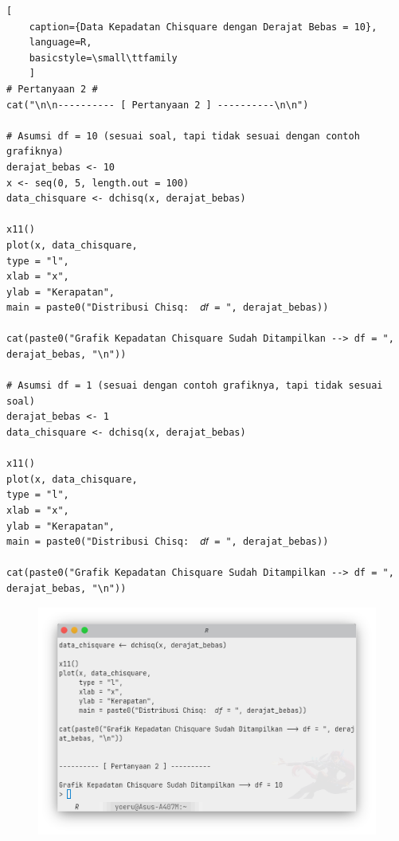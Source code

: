\begin{lstlisting}[
    caption={Data Kepadatan Chisquare dengan Derajat Bebas = 10}, 
    language=R, 
    basicstyle=\small\ttfamily
    ]
# Pertanyaan 2 #
cat("\n\n---------- [ Pertanyaan 2 ] ----------\n\n")

# Asumsi df = 10 (sesuai soal, tapi tidak sesuai dengan contoh grafiknya)
derajat_bebas <- 10
x <- seq(0, 5, length.out = 100)
data_chisquare <- dchisq(x, derajat_bebas)

x11()
plot(x, data_chisquare,
type = "l",
xlab = "x",
ylab = "Kerapatan",
main = paste0("Distribusi Chisq:  𝑑𝑓 = ", derajat_bebas))

cat(paste0("Grafik Kepadatan Chisquare Sudah Ditampilkan --> df = ", derajat_bebas, "\n"))

# Asumsi df = 1 (sesuai dengan contoh grafiknya, tapi tidak sesuai soal)
derajat_bebas <- 1
data_chisquare <- dchisq(x, derajat_bebas)

x11()
plot(x, data_chisquare,
type = "l",
xlab = "x",
ylab = "Kerapatan",
main = paste0("Distribusi Chisq:  𝑑𝑓 = ", derajat_bebas))

cat(paste0("Grafik Kepadatan Chisquare Sudah Ditampilkan --> df = ", derajat_bebas, "\n"))
\end{lstlisting}

\begin{figure}[H]
    \centering
    \includegraphics[width=.8\linewidth]{image/Kepadatan Chisquare df10.png}
    \vspace{-\baselineskip}
\end{figure}

